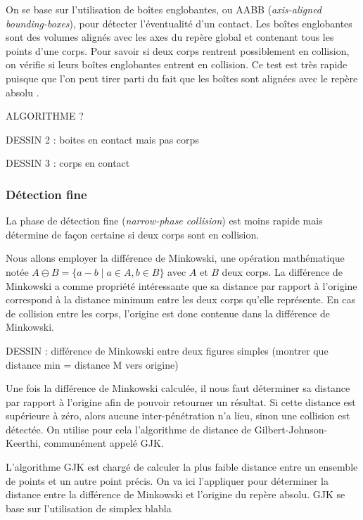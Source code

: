 On se base sur l'utilisation de boîtes englobantes, ou AABB (\textit{axis-aligned bounding-boxes}), pour détecter l'éventualité d'un contact. Les boîtes englobantes sont des volumes alignés avec les axes du repère global et contenant tous les points d'une corps. Pour savoir si deux corps rentrent possiblement en collision, on vérifie si leurs boîtes englobantes entrent en collision. Ce test est très rapide puisque que l'on peut tirer parti du fait que les boîtes sont alignées avec le repère absolu \cite{ericson05}.

ALGORITHME ?

\begin{figure}
  \subfigure{
    
  }
  \subfigure{
    
  }
  \subfigure{
    
  }
\end{figure}

DESSIN 2 : boites en contact mais pas corps

DESSIN 3 : corps en contact

\subsubsection{Détection fine}

La phase de détection fine (\textit{narrow-phase collision}) est moins rapide mais détermine de façon certaine si deux corps sont en collision.

Nous allons employer la différence de Minkowski, une opération mathématique notée $A \ominus B = \{a - b \mid a \in A, b \in B\}$ avec $A$ et $B$ deux corps. La différence de Minkowski a comme propriété intéressante que sa distance par rapport à l'origine correspond à la distance minimum entre les deux corps qu'elle représente. En cas de collision entre les corps, l'origine est donc contenue dans la différence de Minkowski.

DESSIN : différence de Minkowski entre deux figures simples (montrer que distance min = distance M vers origine)

Une fois la différence de Minkowski calculée, il nous faut déterminer sa distance par rapport à l'origine afin de pouvoir retourner un résultat. Si cette distance est supérieure à zéro, alors aucune inter-pénétration n'a lieu, sinon une collision est détectée. On utilise pour cela l'algorithme de distance de Gilbert-Johnson-Keerthi, communément appelé GJK.

L'algorithme GJK est chargé de calculer la plus faible distance entre un ensemble de points et un autre point précis. On va ici l'appliquer pour déterminer la distance entre la différence de Minkowski et l'origine du repère absolu. GJK se base sur l'utilisation de simplex blabla

